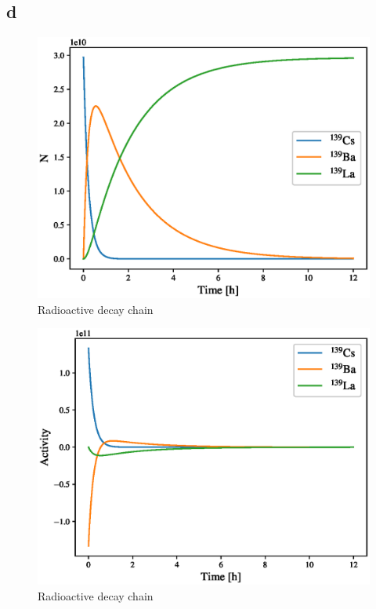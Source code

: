 \subsection*{d}
\begin{figure}[htbp]
    \centering
    \includegraphics[scale=0.8]{ex7/decay.eps}
    \caption{Radioactive decay chain}
    \label{fig:decay_chain}
\end{figure}

\begin{figure}[htbp]
    \centering
    \includegraphics[scale=0.8]{ex7/decay_activities.eps}
    \caption{Radioactive decay chain}
    \label{fig:decay_chain_activities}
\end{figure}


